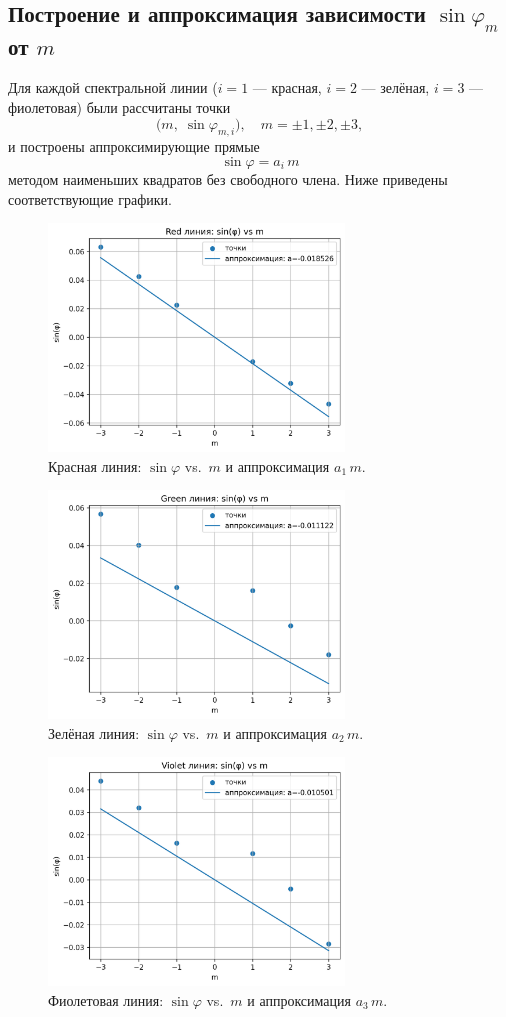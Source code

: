 \subsection*{Построение и аппроксимация зависимости \(\sin\varphi_m\) от \(m\)}

Для каждой спектральной линии (\(i=1\) — красная, \(i=2\) — зелёная, \(i=3\) — фиолетовая) были рассчитаны точки
\[
	\bigl(m,\;\sin\varphi_{m,i}\bigr),
	\quad m=\pm1,\pm2,\pm3,
\]
и построены аппроксимирующие прямые
\[
	\sin\varphi = a_i\,m
\]
методом наименьших квадратов без свободного члена. Ниже приведены соответствующие графики.

\begin{figure}[H]
	\centering
	\includegraphics[width=0.7\textwidth]{images/red_fit.png}
	\caption{Красная линия: \(\sin\varphi\) vs.\ \(m\) и аппроксимация \(a_1\,m\).}
	\label{fig:sinphi-red}
\end{figure}

\begin{figure}[H]
	\centering
	\includegraphics[width=0.7\textwidth]{images/green_fit.png}
	\caption{Зелёная линия: \(\sin\varphi\) vs.\ \(m\) и аппроксимация \(a_2\,m\).}
	\label{fig:sinphi-green}
\end{figure}

\begin{figure}[H]
	\centering
	\includegraphics[width=0.7\textwidth]{images/violet_fit.png}
	\caption{Фиолетовая линия: \(\sin\varphi\) vs.\ \(m\) и аппроксимация \(a_3\,m\).}
	\label{fig:sinphi-violet}
\end{figure}
